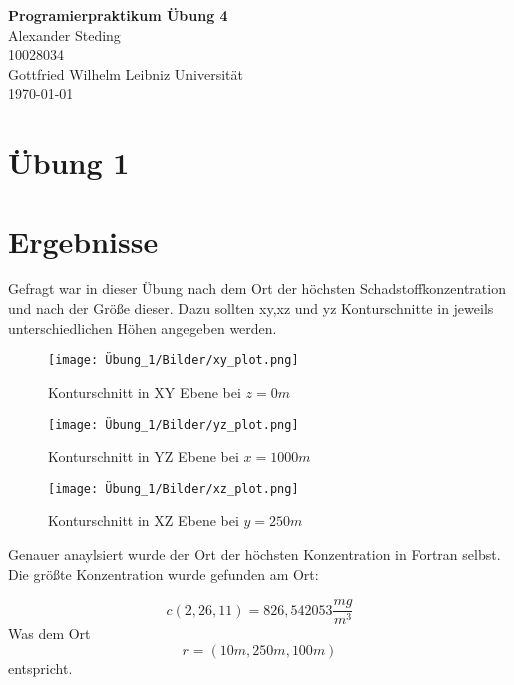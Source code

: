 \documentclass[ngerman]{scrartcl}
\newcommand{\authA}{Alexander Steding}
\begin{document}



\begin{titlepage}
\begin{center}
\vspace{3cm}
{\fontsize{40}{49} \selectfont \textbf{Programierpraktikum Übung 4}}\\[2cm]
\Large{\authA }\\
\Large{10028034 }\\
\large{Gottfried Wilhelm Leibniz Universität\\{\today}}
\end{center}
\end{titlepage}
\tableofcontents  
\newpage

\section{Übung 1}
\section{Ergebnisse}
Gefragt war in dieser Übung nach dem Ort der höchsten Schadstoffkonzentration und nach der Größe dieser. Dazu sollten xy,xz und yz Konturschnitte in jeweils unterschiedlichen Höhen angegeben werden.
\begin{figure}[H]
    \centering
    \texttt{[image: Übung\_1/Bilder/xy\_plot.png]}
    \caption{Konturschnitt in XY Ebene bei $z=0 \si{m}$}
    \label{fig:my_label}
\end{figure}

\begin{figure}[H]
    \centering
    \texttt{[image: Übung\_1/Bilder/yz\_plot.png]}
    \caption{Konturschnitt in YZ Ebene bei $x=1000 \si{m}$}
    \label{fig:my_label}
\end{figure}

\begin{figure}[H]
    \centering
    \texttt{[image: Übung\_1/Bilder/xz\_plot.png]}
    \caption{Konturschnitt in XZ Ebene bei $y=250 \si{m}$}
    \label{fig:my_label}
\end{figure}
Genauer anaylsiert wurde der Ort der höchsten Konzentration in Fortran selbst. Die größte Konzentration wurde gefunden am Ort:

\begin{equation}
    c(2,26,11)=826,542053 \si{\frac{mg}{m^3}}
\end{equation}
Was dem Ort
\begin{equation}
    r=(10\si{m},250\si{m},100\si{m})
\end{equation}
entspricht.
\end{document}
